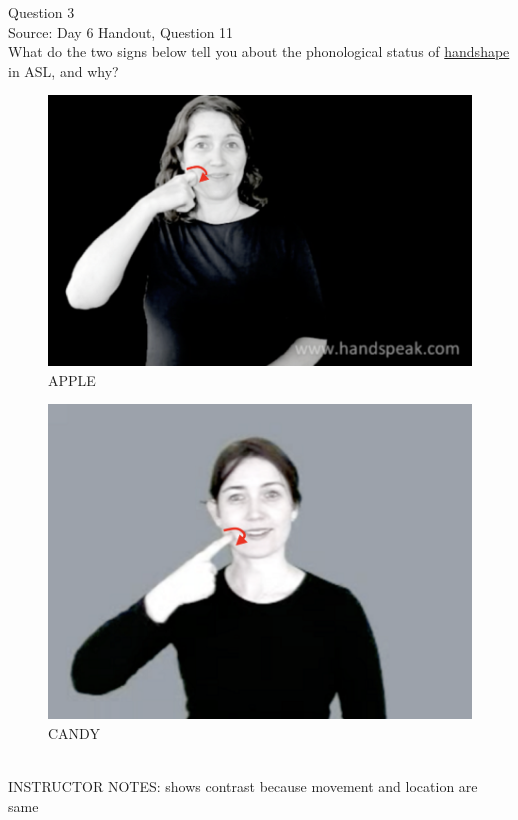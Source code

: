 \documentclass[12pt]{article}
\begin{document}
{\large Question 3}\\

Source: Day 6 Handout, Question 11\\

What do the two signs below tell you about the phonological status of \underline{handshape} in ASL, and why?\\

\begin{figure}[H]
\includegraphics{../images/asl_apple.png}
\caption{APPLE}
\end{figure}
\begin{figure}[H]
\includegraphics{../images/asl_candy.png}
\caption{CANDY}
\end{figure}

~\\
INSTRUCTOR NOTES: shows contrast because movement and location are same
\end{document}
